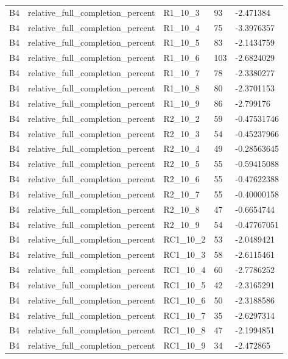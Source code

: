 \begin{longtable}{lllll}
B4 & relative\_full\_completion\_percent & R1\_10\_3 & 93 & -2.471384 \\
B4 & relative\_full\_completion\_percent & R1\_10\_4 & 75 & -3.3976357 \\
B4 & relative\_full\_completion\_percent & R1\_10\_5 & 83 & -2.1434759 \\
B4 & relative\_full\_completion\_percent & R1\_10\_6 & 103 & -2.6824029 \\
B4 & relative\_full\_completion\_percent & R1\_10\_7 & 78 & -2.3380277 \\
B4 & relative\_full\_completion\_percent & R1\_10\_8 & 80 & -2.3701153 \\
B4 & relative\_full\_completion\_percent & R1\_10\_9 & 86 & -2.799176 \\
B4 & relative\_full\_completion\_percent & R2\_10\_2 & 59 & -0.47531746 \\
B4 & relative\_full\_completion\_percent & R2\_10\_3 & 54 & -0.45237966 \\
B4 & relative\_full\_completion\_percent & R2\_10\_4 & 49 & -0.28563645 \\
B4 & relative\_full\_completion\_percent & R2\_10\_5 & 55 & -0.59415088 \\
B4 & relative\_full\_completion\_percent & R2\_10\_6 & 55 & -0.47622388 \\
B4 & relative\_full\_completion\_percent & R2\_10\_7 & 55 & -0.40000158 \\
B4 & relative\_full\_completion\_percent & R2\_10\_8 & 47 & -0.6654744 \\
B4 & relative\_full\_completion\_percent & R2\_10\_9 & 54 & -0.47767051 \\
B4 & relative\_full\_completion\_percent & RC1\_10\_2 & 53 & -2.0489421 \\
B4 & relative\_full\_completion\_percent & RC1\_10\_3 & 58 & -2.6115461 \\
B4 & relative\_full\_completion\_percent & RC1\_10\_4 & 60 & -2.7786252 \\
B4 & relative\_full\_completion\_percent & RC1\_10\_5 & 42 & -2.3165291 \\
B4 & relative\_full\_completion\_percent & RC1\_10\_6 & 50 & -2.3188586 \\
B4 & relative\_full\_completion\_percent & RC1\_10\_7 & 35 & -2.6297314 \\
B4 & relative\_full\_completion\_percent & RC1\_10\_8 & 47 & -2.1994851 \\
B4 & relative\_full\_completion\_percent & RC1\_10\_9 & 34 & -2.472865 \\

\end{longtable}
